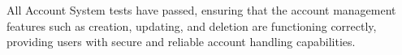 \documentclass[12pt, titlepage]{article}
\begin{document}
All Account System tests have passed, ensuring that the account management features such as creation, updating, and deletion are functioning correctly, providing users with secure and reliable account handling capabilities.



					
					


					

					
					




					
					

\end{document}
